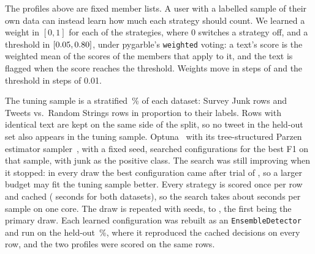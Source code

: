 \documentclass[10pt,twocolumn]{article}
\newcommand{\code}[1]{\texttt{#1}}
\newcommand{\SJ}{Survey Junk}
\newcommand{\TRS}{Tweets vs.\ Random Strings}
\begin{document}
\begin{table}[t]
\centering
\small
\caption{Tuning from a small labelled sample, evaluated on the held-out
\heldoutpct\,\% of each dataset. The tuned configuration has a weight per
strategy and a threshold learned with Optuna on a stratified
\tuningpct\,\% sample; the two profiles run at their defaults on the same
held-out rows. Top: the primary draw (\nHeldA{} \SJ{} rows; \nHeldBpos{}
random strings and \nHeldBneg{} tweets), with 95\,\% bootstrap intervals
beneath. Bottom: mean and sample standard deviation over \tuningdraws{} draws.
Intervals for the tuned row hold the learned weights fixed; variation
between draws is in the bottom block. In the mean block the capture
ranking is within one sample standard deviation. FPR is the share of
tweets flagged. The tuned rows use labelled data from
both datasets and are post hoc in that sense. * best, ** second best per
column within each block.}
\label{tab:tuning}

\end{table}

The profiles above are fixed member lists. A user with a labelled
sample of their own data can instead learn how much each strategy should count. We
learned a weight in $[0,1]$ for each of the \nstrategies{} strategies,
where 0 switches a strategy off, and a threshold in
$[0.05,0.80]$, under pygarble's \code{weighted} voting: a
text's score is the weighted mean of the scores of the members that apply
to it, and the text is flagged when the score reaches the threshold.
Weights move in steps of \tuningweightstep{} and the threshold in steps
of 0.01.

The tuning sample is a stratified \tuningpct\,\% of each dataset:
\nTuneA{} \SJ{} rows and \nTuneB{} \TRS{} rows in proportion to their
labels. Rows with identical text are kept on the same side of the split,
so no tweet in the held-out set also appears in the tuning sample.
Optuna~\citep{optuna} with its tree-structured Parzen estimator
sampler~\citep{bergstra2011tpe}, with a fixed seed, searched
\tuningtrials{} configurations for the best F1 on that sample, with junk
as the positive class. The search was still improving when it stopped:
in every draw the best configuration came after trial \tuningbestmin{}
of \tuningtrials{}, so a larger budget may fit the tuning sample better. Every strategy is scored once per row and cached
(\tuningscoring{} seconds for both datasets), so the search takes about
\tuningseconds{} seconds per sample on one core. The draw is repeated with
\tuningdraws{} seeds, \tuningseed{} to \tuningseedlast{}, the first being
the primary draw. Each learned configuration was rebuilt as an
\code{EnsembleDetector} and run on the held-out \heldoutpct\,\%, where it
reproduced the cached decisions on every row, and the two profiles were
scored on the same rows.
\end{document}

